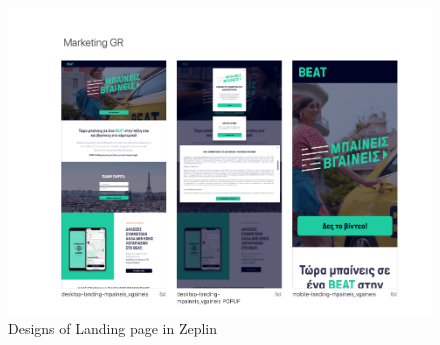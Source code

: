 \begin{figure}[H]
	\begin{center}
		\includegraphics[scale=0.4]{images/my_projects/landing_page/zeplin.png}
	\end{center}
	\caption{Designs of Landing page in Zeplin}
\end{figure}

